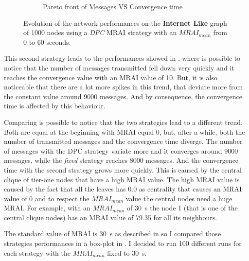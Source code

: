 \begin{figure}[h]
\begin{subfigure}[b]{0.45\textwidth}
		 \caption{Pareto front of Messages VS Convergence time}
         \label{fig:internt_like_1000_DPC_evolution_paretoFront}
     \end{subfigure}
		\caption{Evolution of the network performances on the \textbf{Internet Like} graph 
			of \num{1000} nodes using a \textit{DPC} \ac{MRAI} strategy
			with an $MRAI_{mean}$ from \num{0} to \num{60} seconds.}
        \label{fig:internet_like_1000_dpc_evolution}
\end{figure}

This second strategy leads to the performances showed in ,
where is possible to notice that the number of messages transmitted fell down
very quickly and it reaches the convergence value with an \ac{MRAI} value of
\num{10}.
But, it is also noticeable that there are a lot more spikes in this trend, that
deviate more from the constant value around \num{9000} messages.
And by consequence, the convergence time is affected by this behaviour.

Comparing 
is possible to notice that the two strategies lead to a different trend.
Both are equal at the beginning with \ac{MRAI} equal \num{0}, but, after a while,
both the number of transmitted messages and the convergence time diverge.
The number of messages with the \ac{DPC} strategy variate more and it converges
around \num{9000} messages, while the \textit{fixed} strategy reaches \num{8000}
messages.
And the convergence time with the second strategy grows more quickly.
This is caused by the central clique of tier-one nodes that have a high \ac{MRAI}
value.
The high \ac{MRAI} value is caused by the fact that all the leaves has \num{0.0}
as centrality that causes an \ac{MRAI} value of \num{0} and to respect 
the $MRAI_{mean}$ value the central nodes need a huge \ac{MRAI}.
For example, with an $MRAI_{mean}$ of \SI{30}{\second} the node \num{1} (that is
one of the central clique nodes) has an \ac{MRAI} value of \num{79.35} for all its
neighbours.


The standard value of \ac{MRAI} is \SI{30}{\second} as described in
\cite{rfc4271} so I compared those strategies performances in a box-plot in 
.
I decided to run \num{100} different runs for each strategy with the $MRAI_{mean}$
fixed to \SI{30}{\second}.

